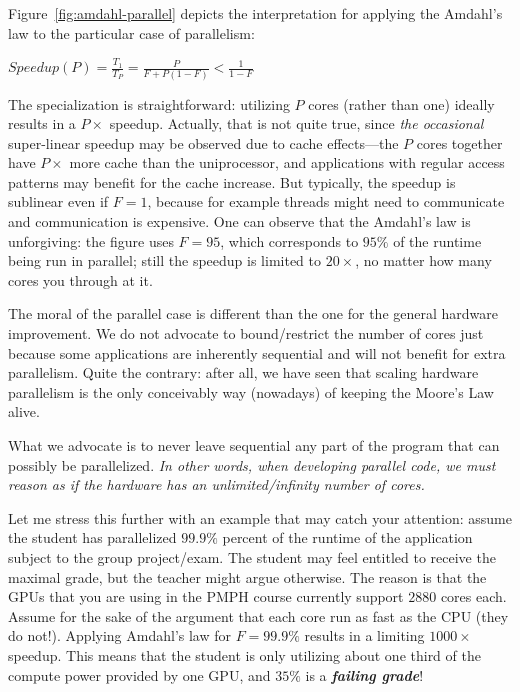 \documentclass[acmsmall,review]{acmart}\settopmatter{printfolios=true,printccs=false,printacmref=false}
\begin{document}
Figure~\ref{fig:amdahl-parallel} depicts the interpretation for
applying the Amdahl's law to the particular case of parallelism:
\begin{center}
$Speedup(P) = \frac{T_1}{T_P} = \frac{P}{F+P(1-F)}<\frac{1}{1-F}$
\end{center}
The specialization is straightforward: utilizing $P$ cores (rather 
than one) ideally results in a $P\times$ speedup. Actually, that 
is not quite true, since \emph{the occasional} super-linear speedup 
may be observed due to cache effects---the $P$ cores together have 
$P\times$ more cache than the uniprocessor, and applications 
with regular access patterns may benefit for the cache increase.
But typically, the speedup is sublinear even if $F=1$, because
for example threads might need to communicate and communication 
is expensive. One can observe that the Amdahl's law is unforgiving:
the figure uses $F=95$, which corresponds to $95\%$ of the runtime
being run in parallel; still the speedup is limited to $20\times$,
no matter how many cores you through at it.

The moral of the parallel case is different than the one for the
general hardware improvement. We do not advocate to bound/restrict 
the number of cores just because some applications are inherently
sequential and will not benefit for extra parallelism. Quite the
contrary: after all, we have seen that scaling hardware parallelism
is the only conceivably way (nowadays) of keeping the Moore's Law
alive. 

What we advocate is to never leave sequential any part of 
the program that can possibly be parallelized. \emph{In other words, 
when developing parallel code, we must reason as if the hardware 
has an unlimited/infinity number of cores.}

Let me stress this further with an example that may catch your attention: 
assume the student has parallelized $99.9\%$ percent of the runtime of 
the application subject to the group project/exam. The student may feel 
entitled to receive the maximal grade, but the teacher might argue 
otherwise. The reason is that the GPUs that you are using in the PMPH 
course currently support $2880$ cores each.   Assume for the sake of 
the argument that each core run as fast as the CPU (they do not!). 
Applying Amdahl's law for $F=99.9\%$ results in a limiting
$1000\times$ speedup. This means that the student is only utilizing
about one third of the compute power provided by one GPU, and $35\%$
is a \emph{\bf failing grade}!
\end{document}
